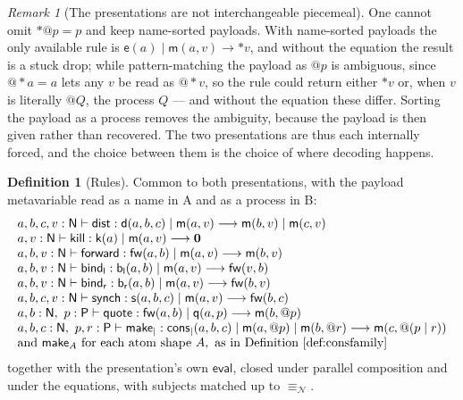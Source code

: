 \documentclass[11pt]{article}
\makeatletter
\theoremstyle{plain}
\theoremstyle{definition}
\newtheorem{definition}[theorem]{Definition}
\theoremstyle{remark}
\newtheorem{remark}[theorem]{Remark}
\newcommand{\quo}[1]{@#1}
\newcommand{\drp}[1]{{*}#1}
\newcommand{\nil}{\mathbf{0}}
\newcommand{\nequiv}{\equiv_{\mathcal{N}}}
\newcommand{\mm}{\mathsf{m}}
\newcommand{\dd}{\mathsf{d}}
\newcommand{\kk}{\mathsf{k}}
\newcommand{\fw}{\mathsf{fw}}
\newcommand{\bl}{\mathsf{b}_{\mathsf{l}}}
\newcommand{\br}{\mathsf{b}_{\mathsf{r}}}
\newcommand{\sy}{\mathsf{s}}
\newcommand{\ev}{\mathsf{e}}
\newcommand{\qq}{\mathsf{q}}
\newcommand{\cons}{\mathsf{cons}}
\newcommand{\red}{\longrightarrow}
\makeatother
\begin{document}
\begin{remark}[The presentations are not interchangeable piecemeal]
\label{rem:notpiecemeal}
One cannot omit $\drp{\quo{p}} = p$ and keep name-sorted payloads. With
name-sorted payloads the only available rule is $\ev(a) \mid \mm(a,v) \red
\drp{v}$, and without the equation the result is a stuck drop; while
pattern-matching the payload as $\quo{p}$ is ambiguous, since
$\quo{\drp{a}} = a$ lets any $v$ be read as $\quo{\drp{v}}$, so the rule
could return either $\drp{v}$ or, when $v$ is literally $\quo{Q}$, the
process $Q$ --- and without the equation these differ. Sorting the payload as
a process removes the ambiguity, because the payload is then given rather
than recovered. The two presentations are thus each internally forced, and
the choice between them is the choice of where decoding happens.
\end{remark}

\begin{definition}[Rules]
\label{def:combred}
Common to both presentations, with the payload metavariable read as a name in
A and as a process in B:
\[
\begin{array}{l}
 a,b,c,v : \mathsf{N} \vdash \mathsf{dist} :
   \dd(a,b,c) \mid \mm(a,v) \red \mm(b,v) \mid \mm(c,v)\\
 a,v : \mathsf{N} \vdash \mathsf{kill} : \kk(a) \mid \mm(a,v) \red \nil\\
 a,b,v : \mathsf{N} \vdash \mathsf{forward} :
   \fw(a,b) \mid \mm(a,v) \red \mm(b,v)\\
 a,b,v : \mathsf{N} \vdash \mathsf{bind}_{\mathsf{l}} :
   \bl(a,b) \mid \mm(a,v) \red \fw(v,b)\\
 a,b,v : \mathsf{N} \vdash \mathsf{bind}_{\mathsf{r}} :
   \br(a,b) \mid \mm(a,v) \red \fw(b,v)\\
 a,b,c,v : \mathsf{N} \vdash \mathsf{synch} :
   \sy(a,b,c) \mid \mm(a,v) \red \fw(b,c)\\
 a,b : \mathsf{N},\ p : \mathsf{P} \vdash \mathsf{quote} :
   \fw(a,b) \mid \qq(a,p) \red \mm(b,\quo{p})\\
 a,b,c : \mathsf{N},\ p,r : \mathsf{P} \vdash \mathsf{make}_{\mid} :
   \cons_{\mid}(a,b,c) \mid \mm(a,\quo{p}) \mid \mm(b,\quo{r})
   \red \mm(c,\quo{(p \mid r)})\\
 \text{and } \mathsf{make}_{A} \text{ for each atom shape } A,
   \text{ as in Definition~\ref{def:consfamily}}
\end{array}
\]
together with the presentation's own $\mathsf{eval}$, closed under parallel
composition and under the equations, with subjects matched up to $\nequiv$.
\end{definition}
\end{document}
